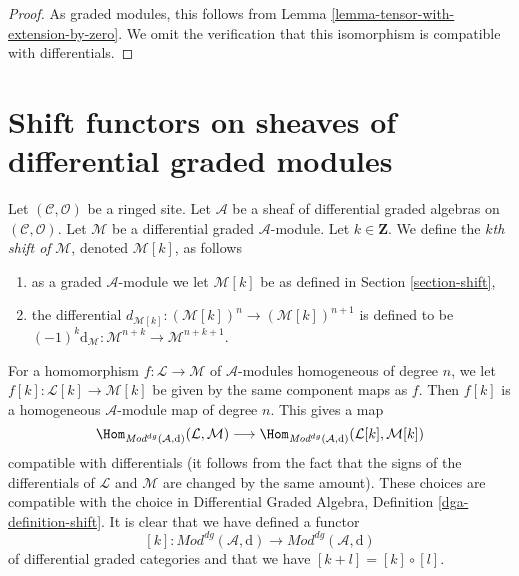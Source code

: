 \begin{proof}
As graded modules, this follows from
Lemma \ref{lemma-tensor-with-extension-by-zero}.
We omit the verification that this isomorphism
is compatible with differentials.
\end{proof}








\section{Shift functors on sheaves of differential graded modules}
\label{section-shift-dg}

\noindent
Let $(\mathcal{C}, \mathcal{O})$ be a ringed site.
Let $\mathcal{A}$ be a sheaf of differential graded algebras
on $(\mathcal{C}, \mathcal{O})$.
Let $\mathcal{M}$ be a differential graded $\mathcal{A}$-module.
Let $k \in \mathbf{Z}$. We define the {\it $k$th shift of} $\mathcal{M}$,
denoted $\mathcal{M}[k]$, as follows
\begin{enumerate}
\item as a graded $\mathcal{A}$-module we let $\mathcal{M}[k]$ be
as defined in Section \ref{section-shift},
\item the differential
$d_{\mathcal{M}[k]} : (\mathcal{M}[k])^n \to (\mathcal{M}[k])^{n + 1}$
is defined to be
$(-1)^k\text{d}_\mathcal{M} : \mathcal{M}^{n + k} \to \mathcal{M}^{n + k + 1}$.
\end{enumerate}
For a homomorphism $f : \mathcal{L} \to \mathcal{M}$ of $\mathcal{A}$-modules
homogeneous of degree $n$, we let $f[k] : \mathcal{L}[k] \to \mathcal{M}[k]$
be given by the same component maps as $f$. Then $f[k]$ is
a homogeneous $\mathcal{A}$-module map of degree $n$.
This gives a map
$$
\Hom_{\textit{Mod}^{dg}(\mathcal{A}, \text{d})}(\mathcal{L}, \mathcal{M})
\longrightarrow
\Hom_{\textit{Mod}^{dg}(\mathcal{A}, \text{d})}
(\mathcal{L}[k], \mathcal{M}[k])
$$
compatible with differentials (it follows from the fact
that the signs of the differentials of $\mathcal{L}$ and
$\mathcal{M}$ are changed by the same amount). These choices are
compatible with the choice in
Differential Graded Algebra, Definition \ref{dga-definition-shift}.
It is clear that we have defined a functor
$$
[k] :
\textit{Mod}^{dg}(\mathcal{A}, \text{d})
\longrightarrow
\textit{Mod}^{dg}(\mathcal{A}, \text{d})
$$
of differential graded categories and that we have
$[k + l] = [k] \circ [l]$.

